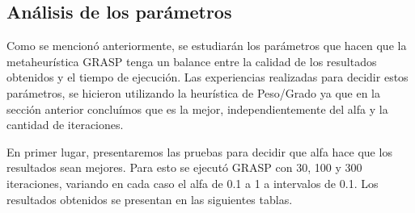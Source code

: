 \documentclass[a4paper,11pt] {article}
\begin{document}
\subsection*{An\'alisis de los par\'ametros}

Como se mencion\'o anteriormente, se estudiar\'an los par\'ametros que hacen que la metaheur\'istica GRASP tenga un balance entre la calidad de los resultados obtenidos y el tiempo de ejecuci\'on. Las experiencias realizadas para decidir estos par\'ametros, se hicieron utilizando la heur\'istica de Peso/Grado ya que en la secci\'on anterior conclu\'imos que es la mejor, independientemente del alfa y la cantidad de iteraciones.

En primer lugar, presentaremos las pruebas para decidir que alfa hace que los resultados sean mejores. Para esto se ejecut\'o GRASP con 30, 100 y 300 iteraciones, variando en cada caso el alfa de 0.1 a 1 a intervalos de 0.1. Los resultados obtenidos se presentan en las siguientes tablas.
\end{document}
